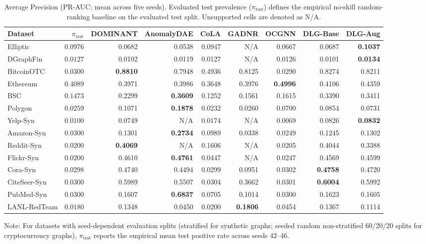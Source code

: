 \documentclass[applsci,article,submit,moreauthors,pdftex]{Definitions/mdpi}
\begin{document}
\begin{table}[htbp]
\centering\footnotesize\setlength{\tabcolsep}{1.8pt}
\caption{Average Precision (PR-AUC; mean across five seeds). Evaluated test prevalence ($\pi_{\mathrm{test}}$) defines the empirical no-skill random-ranking baseline on the evaluated test split. Unsupported cells are denoted as N/A.}
\label{tab:pr_auc_main}
\begin{tabular*}{\textwidth}{@{\extracolsep{\fill}}lrrrrrrrr}\toprule
\textbf{Dataset} & $\pi_{\mathrm{test}}$ & \textbf{DOMINANT} & \textbf{AnomalyDAE} & \textbf{CoLA} & \textbf{GADNR} & \textbf{OCGNN} & \textbf{DLG-Base} & \textbf{DLG-Aug} \\\midrule
Elliptic & $0.0976$ & 0.0682 & 0.0538 & 0.0947 & N/A & 0.0667 & 0.0687 & \textbf{0.1037} \\
DGraphFin & $0.0127$ & 0.0102 & 0.0119 & 0.0127 & N/A & 0.0126 & 0.0101 & \textbf{0.0134} \\
BitcoinOTC & $0.0300$ & \textbf{0.8810} & 0.7948 & 0.4936 & 0.8125 & 0.0290 & 0.8274 & 0.8211 \\
Ethereum & $0.4089$ & 0.3971 & 0.3986 & 0.3648 & 0.3976 & \textbf{0.4996} & 0.4106 & 0.4359 \\
BSC & $0.1473$ & 0.2299 & \textbf{0.3609} & 0.1252 & 0.1561 & 0.1615 & 0.3390 & 0.3411 \\
Polygon & $0.0259$ & 0.1071 & \textbf{0.1878} & 0.0232 & 0.0260 & 0.0700 & 0.0854 & 0.0731 \\
Yelp-Syn & $0.0100$ & 0.0749 & N/A & 0.0174 & N/A & 0.0069 & 0.0826 & \textbf{0.0832} \\
Amazon-Syn & $0.0300$ & 0.1301 & \textbf{0.2734} & 0.0989 & 0.0338 & 0.0249 & 0.1245 & 0.1302 \\
Reddit-Syn & $0.0200$ & \textbf{0.4069} & N/A & 0.1606 & N/A & 0.0205 & 0.4044 & 0.3388 \\
Flickr-Syn & $0.0200$ & 0.4610 & \textbf{0.4761} & 0.0447 & N/A & 0.0247 & 0.4569 & 0.4599 \\
Cora-Syn & $0.0298$ & 0.4740 & 0.4494 & 0.0299 & 0.0951 & 0.0302 & \textbf{0.4758} & 0.4720 \\
CiteSeer-Syn & $0.0300$ & 0.5989 & 0.5507 & 0.0304 & 0.3662 & 0.0301 & \textbf{0.6004} & 0.5992 \\
PubMed-Syn & $0.0300$ & 0.1607 & \textbf{0.6837} & 0.0705 & 0.1014 & 0.0300 & 0.1623 & 0.1605 \\\midrule
LANL-RedTeam & $0.0180$ & 0.1348 & 0.0450 & 0.0200 & \textbf{0.1806} & 0.0454 & 0.1367 & 0.1114 \\\bottomrule
\end{tabular*}
\begin{tablenotes}\footnotesize
\item Note: For datasets with seed-dependent evaluation splits (stratified for synthetic graphs; seeded random non-stratified 60/20/20 splits for cryptocurrency graphs), $\pi_{\mathrm{test}}$ reports the empirical mean test positive rate across seeds 42--46.
\end{tablenotes}
\end{table}
\end{document}
